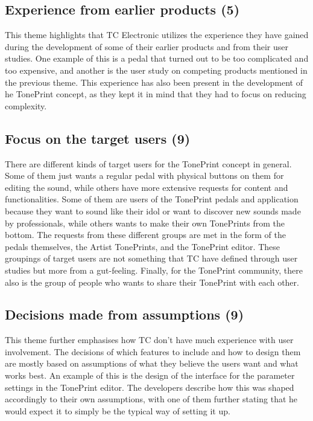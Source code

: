 \subsection*{Experience from earlier products (5)}
\label{App:ThemeExperienceFromEarlierProducts}
This theme highlights that TC Electronic utilizes the experience they have gained during the development of some of their earlier products and from their user studies. One example of this is a pedal that turned out to be too complicated and too expensive, and another is the user study on competing products mentioned in the previous theme. This experience has also been present in the development of he TonePrint concept, as they kept it in mind that they had to focus on reducing complexity.
 
\subsection*{Focus on the target users (9)}
\label{App:ThemeFocusOnTargetUsers}
There are different kinds of target users for the TonePrint concept in general. Some of them just wants a regular pedal with physical buttons on them for editing the sound, while others have more extensive requests for content and functionalities. Some of them are users of the TonePrint pedals and application because they want to sound like their idol or want to discover new sounds made by professionals, while others wants to make their own TonePrints from the bottom. The requests from these different groups are met in the form of the pedals themselves, the Artist TonePrints, and the TonePrint editor. These groupings of target users are not something that TC have defined through user studies but more from a gut-feeling. Finally, for the TonePrint community, there also is the group of people who wants to share their TonePrint with each other.

\subsection*{Decisions made from assumptions (9)} 
\label{App:ThemeDecisionsMadeFromAssumptions}
This theme further emphasises how TC don't have much experience with user involvement. The decisions of which features to include and how to design them are mostly based on assumptions of what they believe the users want and what works best. An example of this is the design of the interface for the parameter settings in the TonePrint editor. The developers describe how this was shaped accordingly to their own assumptions, with one of them further stating that he would expect it to simply be the typical way of setting it up.

